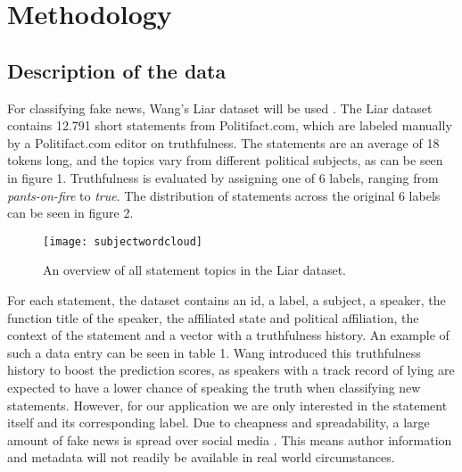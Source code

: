 \section{Methodology}

\subsection{Description of the data}
For classifying fake news, Wang's Liar dataset will be used \cite{wang2018}. 
The Liar dataset contains 12.791 short statements from Politifact.com, which are labeled manually by a Politifact.com editor on truthfulness. 
The statements are an average of 18 tokens long, and the topics vary from different political subjects, as can be seen in figure 1.
Truthfulness is evaluated by assigning one of 6 labels, ranging from \textit{pants-on-fire} to \textit{true}. 
The distribution of statements across the original 6 labels can be seen in figure 2.

\begin{figure}[h]
    \centering
    \texttt{[image: subjectwordcloud]}
    \caption{An overview of all statement topics in the Liar dataset.}
\end{figure}

For each statement, the dataset contains an id, a label, a subject, a speaker, the function title of the speaker, the affiliated state and political affiliation, the context of the statement and a vector with a truthfulness history.
An example of such a data entry can be seen in table 1.
Wang introduced this truthfulness history to boost the prediction scores, as speakers with a track record of lying are expected to have a lower chance of speaking the truth when classifying new statements.
However, for our application we are only interested in the statement itself and its corresponding label. 
Due to cheapness and spreadability, a large amount of fake news is spread over social media \cite{shu2017}. 
This means author information and metadata will not readily be available in real world circumstances.

